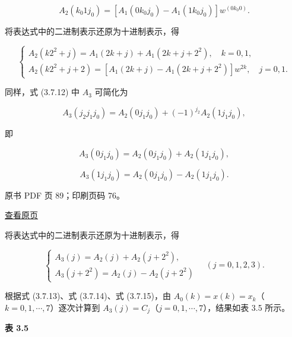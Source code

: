 \[
A_2(k_0 1j_0)=[A_1(0k_0j_0)-A_1(1k_0j_0)]w^{(0k_0 0)}.
\]

将表达式中的二进制表示还原为十进制表示，得

\[
\begin{cases}
A_2(k2^2+j)=A_1(2k+j)+A_1(2k+j+2^2),\quad k=0,1,\\
A_2(k2^2+j+2)=[A_1(2k+j)-A_1(2k+j+2^2)]w^{2k},\quad j=0,1.
\end{cases}\tag{3.7.14}
\]

同样，式 (3.7.12) 中 \(A_3\) 可简化为

\[
A_3(j_2j_1j_0)=A_2(0j_1j_0)+(-1)^{j_2}A_2(1j_1j_0),
\]

即

\[
A_3(0j_1j_0)=A_2(0j_1j_0)+A_2(1j_1j_0),
\]

\[
A_3(1j_1j_0)=A_2(0j_1j_0)-A_2(1j_1j_0).
\]

\clearpage

原书 PDF 页 89；印刷页码 76。

\href{source-images/pdf-089.jpeg}{查看原页}

将表达式中的二进制表示还原为十进制表示，得

\[
\begin{cases}
A_3(j)=A_2(j)+A_2(j+2^2),\\
A_3(j+2^2)=A_2(j)-A_2(j+2^2)
\end{cases}\quad(j=0,1,2,3).\tag{3.7.15}
\]

根据式 (3.7.13)、式 (3.7.14)、式 (3.7.15)，由 \(A_0(k)=x(k)=x_k\)（\(k=0,1,\cdots,7\)）逐次计算到 \(A_3(j)=C_j\)（\(j=0,1,\cdots,7\)），结果如表 3.5 所示。

\textbf{表 3.5}

